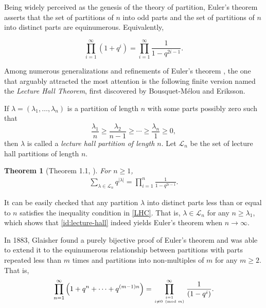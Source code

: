 \documentclass[11pt,reqno]{amsart}
\numberwithin{equation}{section}
\theoremstyle{plain}
\newtheorem{theorem}{Theorem}[section]
\theoremstyle{definition}
\newcommand{\LL}{\mathcal{L}}
\begin{document}
Being widely perceived as the genesis of the theory of partition, Euler's theorem asserts that the set of partitions of $n$ into odd parts and the set of partitions of $n$ into distinct parts are equinumerous. Equivalently,

\begin{equation*}
\prod_{i=1}^{\infty} (1+q^i)=\prod_{i=1}^{\infty} \frac{1}{1-q^{2i-1}}.
\end{equation*}


Among numerous generalizations and refinements of Euler's theorem \cite{And1, And2, BME1, BME2, BME3, CGJL, CYZ, Fin, Hir, Moo, RV, PP, Pak, Sav, Sta, Syl, Yee1}, the one that arguably attracted the most attention is the following finite version named the \emph{Lecture Hall Theorem}, first discovered by Bousquet-M\'elou and Eriksson.

If $\lambda=(\lambda_1, \ldots, \lambda_n)$ is a partition of length $n$ with some parts possibly zero such that
\begin{equation}
 \frac{\lambda_1}{n}\ge\frac{\lambda_2}{n-1}\ge\cdots\ge\frac{\lambda_n}{1}\ge 0, \label{LHC}
\end{equation}
then $\lambda$ is called a \emph{lecture hall partition of length $n$}. Let $\LL_n$ be the set of lecture hall partitions of length $n$.

\begin{theorem}[Theorem 1.1, \cite{BME1}]
For $n\ge 1$,
\begin{align}\label{id:lecture-hall}
\sum_{\lambda\in\LL_n}q^{|\lambda|}=\prod_{i=1}^{n}\frac{1}{1-q^{2i-1}}.
\end{align}
\end{theorem}

It can be easily checked that any partition $\lambda$ into distinct parts less than or equal to $n$ satisfies the inequality condition in \eqref{LHC}. That is,  $\lambda\in\LL_n$ for any $n\ge \lambda_1$, which shows that \eqref{id:lecture-hall} indeed yields Euler's theorem when $n\rightarrow \infty$.

In 1883, Glaisher \cite{Gla} found a purely bijective proof of Euler's theorem and was able to extend it to the equinumerous relationship between partitions with parts repeated less than $m$ times and partitions into non-multiples of $m$ for any $m\ge 2$. 
That is,
\begin{equation*}
\prod_{n=1}^{\infty}\left(1+q^{n}+\cdots +q^{(m-1)n}\right)=\prod_{i=1\atop i\not\equiv 0 \pmod{m}}^{\infty} \frac{1}{(1-q^{i})}.
\end{equation*}
\end{document}
